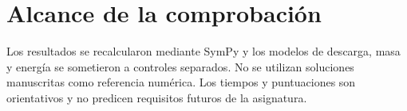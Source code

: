 \section*{Alcance de la comprobación} Los resultados se recalcularon mediante SymPy y los modelos de descarga, masa y energía se sometieron a controles separados. No se utilizan soluciones manuscritas como referencia numérica. Los tiempos y puntuaciones son orientativos y no predicen requisitos futuros de la asignatura.
